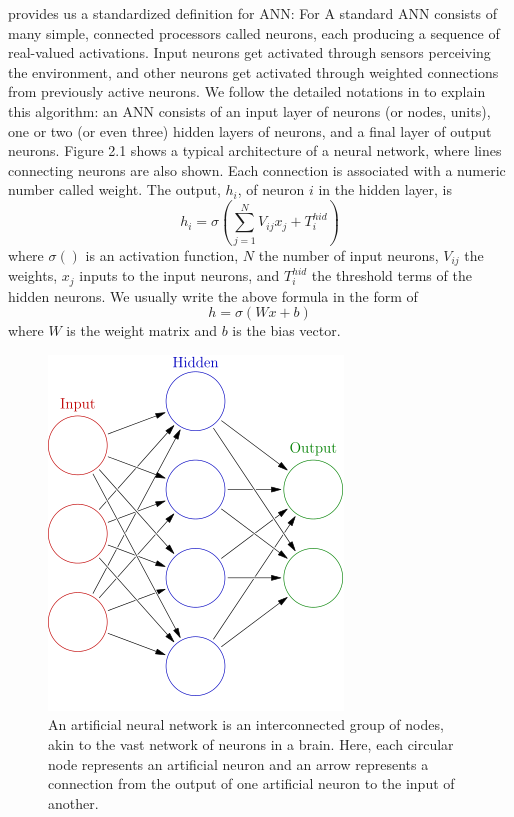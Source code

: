 \documentclass[12pt]{report} %
\begin{document}
\cite{NN} provides us a standardized definition for ANN: For A standard ANN consists of many simple, connected processors called neurons, each producing a sequence of real-valued activations. Input neurons get activated through sensors perceiving the environment, and other neurons get activated through weighted connections from previously active neurons. We follow the detailed notations in \cite{NN2} to explain this algorithm: an ANN consists of an input layer of neurons (or nodes, units), one or two (or even three) hidden layers of neurons, and a final layer of output neurons. Figure 2.1 shows a typical architecture of a neural network, where lines connecting neurons are also shown. Each connection is associated with a numeric number called weight. The output, $h_{i}$, of neuron $i$ in the hidden layer, is
\begin{equation}
h_{i}=\sigma(\sum _{j=1}^{N}V_{ij}x_{j}+T_{i}^{hid})
\end{equation}
where $\sigma()$ is an activation function, $N$ the number of input neurons,  $V_{ij}$ the weights, $x_{j}$ inputs to the input neurons, and $T_{i}^{hid}$ the threshold terms of the hidden neurons\cite{NN2}. We usually write the above formula in the form of
\begin{equation}
h=\sigma(Wx+b)
\end{equation}
where $W$ is the weight matrix and $b$ is the bias vector.
\begin{figure}[H]
	\centering
	\includegraphics[scale=0.4]{pictures/neural_network.png}
	\caption{An artificial neural network is an interconnected group of nodes, akin to the vast network of neurons in a brain. Here, each circular node represents an artificial neuron and an arrow represents a connection from the output of one artificial neuron to the input of another\cite{NNPIC}.}
	\label{fig:1}
\end{figure}
\end{document}
